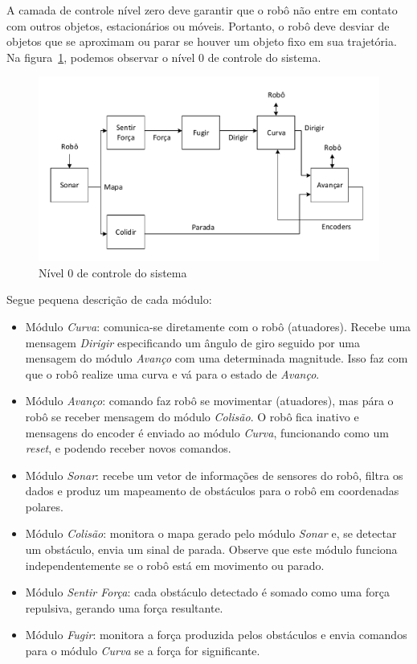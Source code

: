 A camada de controle nível zero deve garantir que o robô não entre em contato
com outros objetos, estacionários ou móveis. Portanto, o robô deve desviar de
objetos que se aproximam ou parar se houver um objeto fixo em sua trajetória.
Na figura~\ref{BROOKS_3}, podemos observar o nível 0 de controle do sistema.

\begin{figure}[H]
\centering
\includegraphics[width=1\columnwidth]{figs/BROOKS_3.pdf}
\caption{Nível 0 de controle do sistema}
\label{BROOKS_3}
\end{figure}

Segue pequena descrição de cada módulo:
\begin{itemize}
  \item Módulo \emph{Curva}: comunica-se diretamente com o robô (atuadores).
  Recebe uma mensagem \emph{Dirigir} especificando um ângulo de giro seguido por
  uma mensagem do módulo \emph{Avanço} com uma determinada magnitude. Isso faz
  com que o robô realize uma curva e vá para o estado de \emph{Avanço}.
  \item Módulo \emph{Avanço}: comando faz robô se movimentar (atuadores), mas
  pára o robô se receber mensagem do módulo \emph{Colisão}. O robô fica inativo
  e mensagens do encoder é enviado ao módulo \emph{Curva}, funcionando como um
  \emph{reset}, e podendo receber novos comandos.
  \item Módulo \emph{Sonar}: recebe um vetor de informações de sensores do robô,
  filtra os dados e produz um mapeamento de obstáculos para o robô em
  coordenadas polares.
  \item Módulo \emph{Colisão}: monitora o mapa gerado pelo módulo \emph{Sonar}
  e, se detectar um obstáculo, envia um sinal de parada. Observe que este módulo
  funciona independentemente se o robô está em movimento ou parado.
  \item Módulo \emph{Sentir Força}: cada obstáculo detectado é somado
  como uma força repulsiva, gerando uma força resultante.
  \item Módulo \emph{Fugir}: monitora a força produzida pelos obstáculos e envia
  comandos para o módulo \emph{Curva} se a força for significante.
\end{itemize}
 
